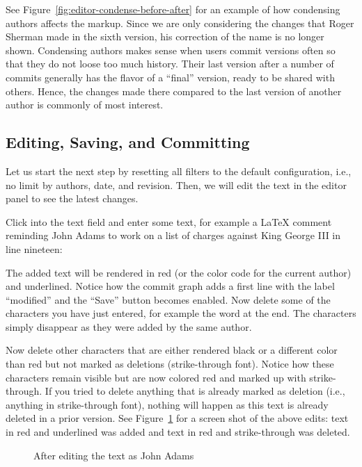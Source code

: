 See Figure~\ref{fig:editor-condense-before-after} for an example of how condensing authors affects the markup.  Since we are only considering the changes that Roger Sherman made in the sixth version, his correction of the name is no longer shown.  Condensing authors makes sense when users commit versions often so that they do not loose too much history.  Their last version after a number of commits generally has the flavor of a ``final'' version, ready to be shared with others.  Hence, the changes made there compared to the last version of another author is commonly of most interest.

\subsection{Editing, Saving, and Committing}

Let us start the next step by resetting all filters to the default configuration, i.e., no limit by authors, date, and revision.  Then, we will edit the text in the editor panel to see the latest changes.

Click into the text field and enter some text, for example a LaTeX comment reminding John Adams to work on a list of charges against King George III in line nineteen:
\begin{FileVerbatim}
\end{FileVerbatim}
The added text will be rendered in red (or the color code for the current author) and underlined.  Notice how the commit graph adds a first line with the label ``modified'' and the ``Save'' button becomes enabled.  Now delete some of the characters you have just entered, for example the word  at the end.  The characters simply disappear as they were added by the same author.

Now delete other characters that are either rendered black or a different color than red but not marked as deletions (strike-through font).  Notice how these characters remain visible but are now colored red and marked up with strike-through.  If you tried to delete anything that is already marked as deletion (i.e., anything in strike-through font), nothing will happen as this text is already deleted in a prior version.  See Figure~\ref{fig:editor-modified} for a screen shot of the above edits: text in red and underlined was added and text in red and strike-through was deleted.

\begin{figure}[t]
\centering
{}
\caption{After editing the text as John Adams} \label{fig:editor-modified}
\end{figure}

